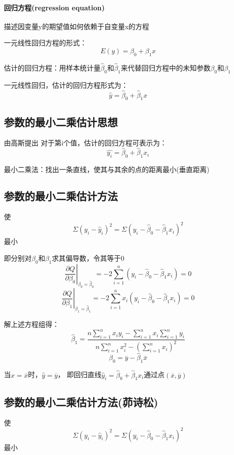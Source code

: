 \documentclass[UTF8,10pt]{book}
\begin{document}
\paragraph{回归方程(regression equation)	}
描述因变量y的期望值如何依赖于自变量x的方程 

一元线性回归方程的形式： 
$$E(y) = \beta_0 + \beta_1 x $$ 

估计的回归方程：用样本统计量$\hat{\beta}_0$和$\hat{\beta}_1$来代替回归方程中的未知参数$\beta_0$和$\beta_1$ 

一元线性回归，估计的回归方程形式为： 
$$ \hat{y} = \hat{\beta}_0 + \hat{\beta}_1 x $$

\subsection{参数的最小二乘估计思想}	

由高斯提出 对于第i个值，估计的回归方程可表示为： 
$$ \hat{y_i} = \hat{\beta}_0 + \hat{\beta}_1 x_i $$ 

最小二乘法：找出一条直线，使其与其余的点的距离最小(垂直距离)

\subsection{参数的最小二乘估计方法}	

使 
$$\Sigma(y_i - \hat{y}_i)^2 = \Sigma(y_i - \hat{\beta}_0 - \hat{\beta}_1 x_i)^2$$ 
最小 

即分别对$\beta_0$和$\beta_1$求其偏导数，令其等于0 
$$ \left. \frac{\partial Q}{\partial \beta_0}\right|_{\beta_0 = \hat{\beta}_0} = -2 \sum_{i=1}^n (y_i - \hat{\beta}_0 - \hat{\beta}_1 x_i) = 0 $$ 
$$ \left. \frac{\partial Q}{\partial \beta_1}\right|_{\beta_1 = \hat{\beta}_1} = -2 \sum_{i=1}^n x_i(y_i - \hat{\beta}_0 - \hat{\beta}_1 x_i) = 0 $$ 

解上述方程组得： 
$$ \hat{\beta}_1 = \frac{n \sum_{i=1}^n x_i y_i - \sum_{i=1}^n x_i \sum_{i=1}^n y_i}{n \sum_{i=1}^n x_i^2 - \left(\sum_{i=1}^n x_i\right)^2} $$ 
$$\hat{\beta}_0 = \overline{y} - \hat{\beta}_1 \overline{x}$$ 

当$x=\overline{x}$时，$\hat{y}=\overline{y}$，
即回归直线$\hat{y}_i=\hat{\beta}_0+\hat{\beta}_1 x_i$通过点$(\overline{x},\overline{y})$

\subsection{参数的最小二乘估计方法(茆诗松)}	
使 
$$\Sigma(y_i - \hat{y}_i)^2 = \Sigma(y_i - \hat{\beta}_0 - \hat{\beta}_1 x_i)^2$$ 
最小 
\end{document}
